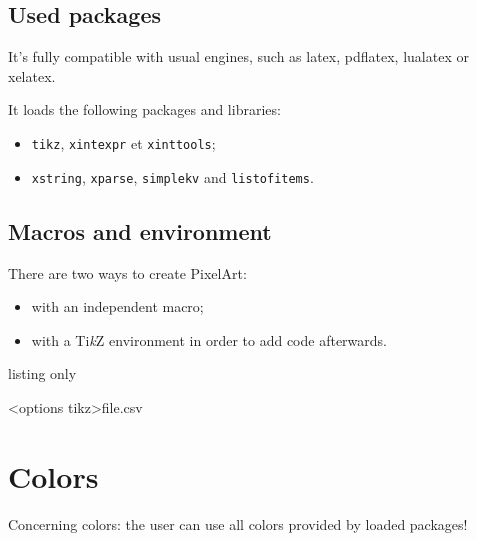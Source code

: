 \documentclass{article}
\begin{document}
\subsection{Used packages}

It's fully compatible with usual  engines, such as \textsf{latex}, \textsf{pdflatex}, \textsf{lualatex} or \textsf{xelatex}.

\medskip

It loads the following packages and libraries:

\begin{itemize}
	\item \texttt{tikz}, \texttt{xintexpr} et \texttt{xinttools};
	\item \texttt{xstring}, \texttt{xparse}, \texttt{simplekv} and \texttt{listofitems}.
\end{itemize}

\pagebreak

\subsection{Macros and environment}

There are two ways to create PixelArt:

\begin{itemize}
	\item with an independent macro;
	\item with a Ti\textit{k}Z environment in order to add code afterwards.
\end{itemize}

\begin{PresentationCode}{listing only}


\begin{EnvPixlArtTikz}[keys]<options tikz>{file.csv}
\end{EnvPixlArtTikz}
\end{PresentationCode}

\section{Colors}

Concerning colors: the user can use all colors provided by loaded packages!

\smallskip
\end{document}
